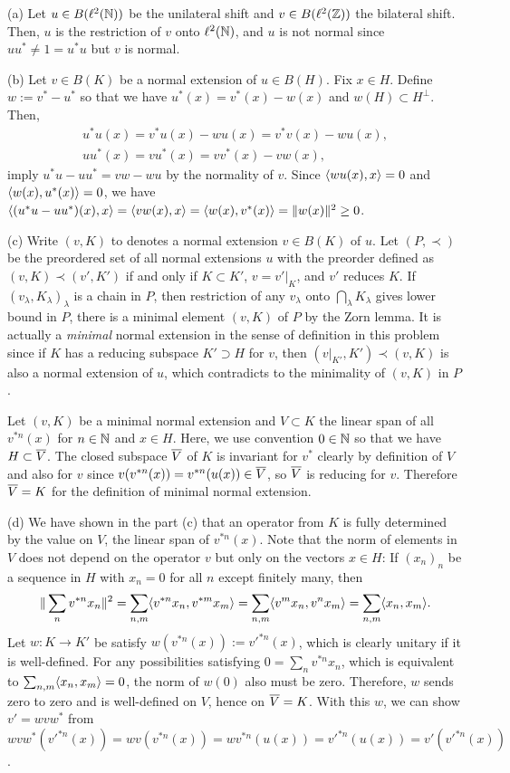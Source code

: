 \documentclass[12pt]{article}
\begin{document}
\begin{sol}
(a)
Let $u\in B(\ell^2(\mathbb{N}))$ be the unilateral shift and $v\in B(\ell^2(\mathbb{Z}))$ the bilateral shift.
Then, $u$ is the restriction of $v$ onto $\ell^2(\mathbb{N})$, and $u$ is not normal since $uu^*\ne1=u^*u$ but $v$ is normal.

(b)
Let $v\in B(K)$ be a normal extension of $u\in B(H)$.
Fix $x\in H$.
Define $w:=v^*-u^*$ so that we have $u^*(x)=v^*(x)-w(x)$ and $w(H)\subset H^\perp$.
Then,
\begin{gather*}
u^*u(x)=v^*u(x)-wu(x)=v^*v(x)-wu(x),\\
uu^*(x)=vu^*(x)=vv^*(x)-vw(x),
\end{gather*}
imply $u^*u-uu^*=vw-wu$ by the normality of $v$.
Since $\langle wu(x),x\rangle=0$ and $\langle w(x),u^*(x)\rangle=0$, we have $\langle(u^*u-uu^*)(x),x\rangle=\langle vw(x),x\rangle=\langle w(x),v^*(x)\rangle=\|w(x)\|^2\ge0$.

(c)
Write $(v,K)$ to denotes a normal extension $v\in B(K)$ of $u$.
Let $(P,\prec)$ be the preordered set of all normal extensions $u$ with the preorder defined as $(v,K)\prec(v',K')$ if and only if $K\subset K'$, $v=v'|_K$, and $v'$ reduces $K$.
If $(v_\lambda,K_\lambda)_\lambda$ is a chain in $P$, then restriction of any $v_\lambda$ onto $\bigcap_\lambda K_\lambda$ gives lower bound in $P$, there is a minimal element $(v,K)$ of $P$ by the Zorn lemma.
It is actually a \emph{minimal} normal extension in the sense of definition in this problem since if $K$ has a reducing subspace $K'\supset H$ for $v$, then $(v|_{K'},K')\prec(v,K)$ is also a normal extension of $u$, which contradicts to the minimality of $(v,K)$ in $P$.

Let $(v,K)$ be a minimal normal extension and $V\subset K$ the linear span of all $v^{*n}(x)$ for $n\in\mathbb{N}$ and $x\in H$.
Here, we use convention $0\in\mathbb{N}$ so that we have $H\subset\overline V$.
The closed subspace $\overline V$ of $K$ is invariant for $v^*$ clearly by definition of $V$ and also for $v$ since $v(v^{*n}(x))=v^{*n}(u(x))\in \overline V$, so $\overline V$ is reducing for $v$.
Therefore $\overline V=K$ for the definition of minimal normal extension.

(d)
We have shown in the part (c) that an operator from $K$ is fully determined by the value on $V$, the linear span of $v^{*n}(x)$.
Note that the norm of elements in $V$ does not depend on the operator $v$ but only on the vectors $x\in H$:
If $(x_n)_n$ be a sequence in $H$ with $x_n=0$ for all $n$ except finitely many, then
\[\|\sum_n v^{*n}x_n\|^2
=\sum_{n,m}\langle v^{*n}x_n,v^{*m}x_m\rangle
=\sum_{n,m}\langle v^mx_n,v^nx_m\rangle
=\sum_{n,m}\langle x_n,x_m\rangle.\]
Let $w:K\to K'$ be satisfy $w(v^{*n}(x)):=v'^{*n}(x)$, which is clearly unitary if it is well-defined.
For any possibilities satisfying $0=\sum_nv^{*n}x_n$, which is equivalent to $\sum_{n,m}\langle x_n,x_m\rangle=0$, the norm of $w(0)$ also must be zero.
Therefore, $w$ sends zero to zero and is well-defined on $V$, hence on $\overline V=K$.
With this $w$, we can show $v'=wvw^*$ from $wvw^*(v'^{*n}(x))=wv(v^{*n}(x))=wv^{*n}(u(x))=v'^{*n}(u(x))=v'(v'^{*n}(x))$.
\end{sol}
\end{document}
